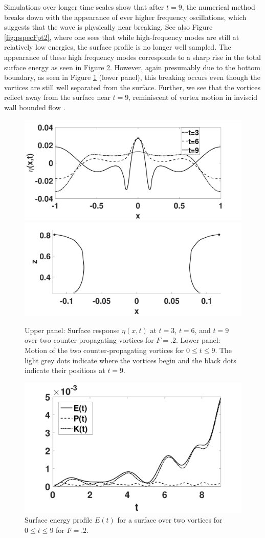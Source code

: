 \documentclass[a4paper,11pt]{article}
\begin{document}
Simulations over longer time scales show that after $t=9$, the numerical method breaks down with the appearance of ever higher frequency oscillations, which suggests that the wave is physically near breaking.  See also Figure \ref{fig:pspecFpt2}, where one sees that while high-frequency modes are still at relatively low energies, the surface profile is no longer well sampled.  The appearance of these high frequency modes corresponds to a sharp rise in the total surface energy as seen in Figure \ref{fig:eprof_tv}.  However, again presumably due to the bottom boundary, as seen in Figure \ref{fig:surfrepFpt2} (lower panel), this breaking occurs even though the vortices are still well separated from the surface.  Further, we see that the vortices reflect away from the surface near $t=9$, reminiscent of vortex motion in inviscid wall bounded flow \cite{lamb}. 
\begin{figure}[!h]
\centering
\includegraphics[width=.7\textwidth]{surf_resp_mu_pt2_F_pt2}
\includegraphics[width=.7\textwidth]{tracks_F_pt2_tf_9}
\caption{\small Upper panel: Surface response $\eta(x,t)$ at $t=3$, $t=6$, and $t=9$ over two counter-propagating vortices for $F=.2$. Lower panel:
Motion of the two counter-propagating vortices for $0\leq t \leq 9$.  The light grey dots indicate where the vortices begin and the black dots indicate their positions at $t=9$.}
\label{fig:surfrepFpt2}
\end{figure}
%
\begin{figure}[!h]
\centering
\includegraphics[width=.6\textwidth]{energy_profile_mu_pt2_F_pt2_tv}
\caption{\small Surface energy profile $E(t)$ for a surface over two vortices for $0\leq t \leq 9$ for $F=.2$.}
\label{fig:eprof_tv}
\end{figure}
\end{document}
